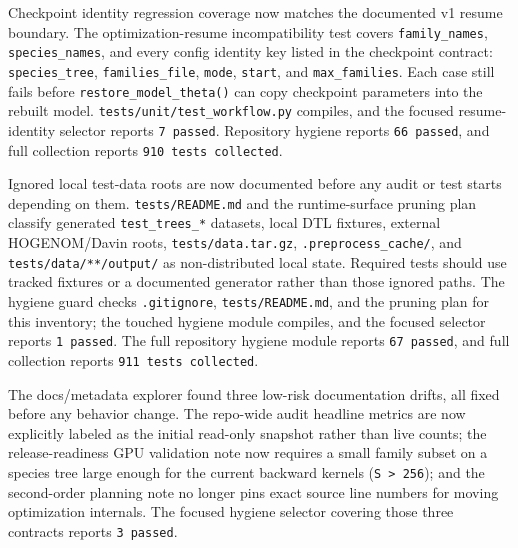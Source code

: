 \documentclass[11pt]{article}
\begin{document}
Checkpoint identity regression coverage now matches the documented v1 resume
boundary.  The optimization-resume incompatibility test covers
\texttt{family\_names}, \texttt{species\_names}, and every config identity key
listed in the checkpoint contract: \texttt{species\_tree},
\texttt{families\_file}, \texttt{mode}, \texttt{start}, and
\texttt{max\_families}.  Each case still fails before
\texttt{restore\_model\_theta()} can copy checkpoint parameters into the rebuilt
model.  \texttt{tests/unit/test\_workflow.py} compiles, and the focused
resume-identity selector reports \texttt{7 passed}.  Repository hygiene reports
\texttt{66 passed}, and full collection reports \texttt{910 tests collected}.

Ignored local test-data roots are now documented before any audit or test starts
depending on them.  \texttt{tests/README.md} and the runtime-surface pruning plan
classify generated \texttt{test\_trees\_*} datasets, local DTL fixtures,
external HOGENOM/Davin roots, \texttt{tests/data.tar.gz},
\texttt{.preprocess\_cache/}, and \texttt{tests/data/**/output/} as
non-distributed local state.  Required tests should use tracked fixtures or a
documented generator rather than those ignored paths.  The hygiene guard checks
\texttt{.gitignore}, \texttt{tests/README.md}, and the pruning plan for this
inventory; the touched hygiene module compiles, and the focused selector reports
\texttt{1 passed}.  The full repository hygiene module reports \texttt{67
passed}, and full collection reports \texttt{911 tests collected}.

The docs/metadata explorer found three low-risk documentation drifts, all fixed
before any behavior change.  The repo-wide audit headline metrics are now
explicitly labeled as the initial read-only snapshot rather than live counts; the
release-readiness GPU validation note now requires a small family subset on a
species tree large enough for the current backward kernels
(\texttt{S > 256}); and the second-order planning note no longer pins exact
source line numbers for moving optimization internals.  The focused hygiene
selector covering those three contracts reports \texttt{3 passed}.
\end{document}
